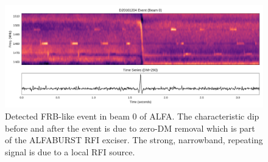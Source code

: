 \documentclass[a4paper,fleqn,usenatbib]{mnras}
\begin{document}
\begin{figure}
    \includegraphics[width=1.0\linewidth]{figures/D20161204_buf23_Beam0_wide.pdf}
    \caption{Detected FRB-like event in beam 0 of ALFA. The characteristic dip
    before and after the event is due to zero-DM removal which is part of the
    ALFABURST RFI exciser. The strong, narrowband, repeating signal is due to a
    local RFI source.
    }
    \label{fig:beam0_dynamic_spec_wide}
\end{figure}
\end{document}

